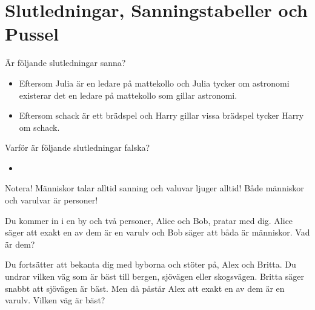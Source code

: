 \section{Slutledningar, Sanningstabeller och Pussel}

\begin{definition}[Slutledning]
	
\end{definition}
\begin{problem}
	Är följande slutledningar sanna?
	\begin{itemize}
		\item Eftersom Julia är en ledare på mattekollo och Julia tycker om astronomi existerar det en ledare på mattekollo som gillar astronomi.
		\item Eftersom schack är ett brädspel och Harry gillar vissa brädspel tycker Harry om schack.
	\end{itemize}
\end{problem}

\begin{problem}
	Varför är följande slutledningar falska?
	\begin{itemize}
		\item 
	\end{itemize}
	
\end{problem}


Notera! Människor talar alltid sanning och valuvar ljuger alltid! Både människor och varulvar är personer!
\begin{problem}
	Du kommer in i en by och två personer, Alice och Bob, pratar med dig. Alice säger att exakt en av dem är en varulv och Bob säger att båda är människor. Vad är dem?
\end{problem}

\begin{problem}
	Du fortsätter att bekanta dig med byborna och stöter på, Alex och Britta. Du undrar vilken väg som är bäst till bergen, sjövägen eller skogsvägen. Britta säger snabbt att sjövägen är bäst. Men då påstår Alex att exakt en av dem är en varulv. Vilken väg är bäst?
\end{problem}


